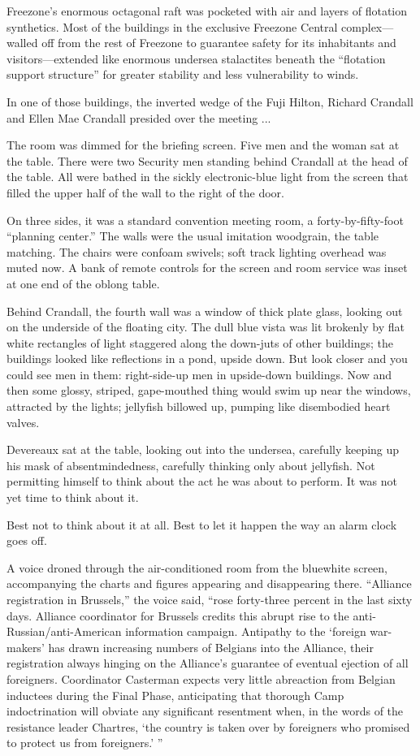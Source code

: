 Freezone's enormous octagonal raft was pocketed with air and layers of flotation synthetics. Most of the buildings in the exclusive Freezone Central complex---walled off from the rest of Freezone to guarantee safety for its inhabitants and visitors---extended like enormous undersea stalactites beneath the ``flotation support structure'' for greater stability and less vulnerability to winds.

In one of those buildings, the inverted wedge of the Fuji Hilton, Richard Crandall and Ellen Mae Crandall presided over the meeting ...

The room was dimmed for the briefing screen. Five men and the woman sat at the table. There were two Security men standing behind Crandall at the head of the table. All were bathed in the sickly electronic-blue light from the screen that filled the upper half of the wall to the right of the door.

On three sides, it was a standard convention meeting room, a forty-by-fifty-foot ``planning center.'' The walls were the usual imitation woodgrain, the table matching. The chairs were confoam swivels; soft track lighting overhead was muted now. A bank of remote controls for the screen and room service was inset at one end of the oblong table.

Behind Crandall, the fourth wall was a window of thick plate glass, looking out on the underside of the floating city. The dull blue vista was lit brokenly by flat white rectangles of light staggered along the down-juts of other buildings; the buildings looked like reflections in a pond, upside down. But look closer and you could see men in them: right-side-up men in upside-down buildings. Now and then some glossy, striped, gape-mouthed thing would swim up near the windows, attracted by the lights; jellyfish billowed up, pumping like disembodied heart valves.

Devereaux sat at the table, looking out into the undersea, carefully keeping up his mask of absentmindedness, carefully thinking only about jellyfish. Not permitting himself to think about the act he was about to perform. It was not yet time to think about it.

Best not to think about it at all. Best to let it happen the way an alarm clock goes off.

A voice droned through the air-conditioned room from the bluewhite screen, accompanying the charts and figures appearing and disappearing there. ``Alliance registration in Brussels,'' the voice said, ``rose forty-three percent in the last sixty days. Alliance coordinator for Brussels credits this abrupt rise to the anti-Russian/anti-American information campaign. Antipathy to the ‘foreign war-makers' has drawn increasing numbers of Belgians into the Alliance, their registration always hinging on the Alliance's guarantee of eventual ejection of all foreigners. Coordinator Casterman expects very little abreaction from Belgian inductees during the Final Phase, anticipating that thorough Camp indoctrination will obviate any significant resentment when, in the words of the resistance leader Chartres, ‘the country is taken over by foreigners who promised to protect us from foreigners.' ''

